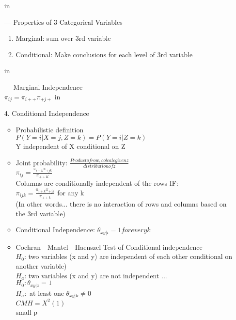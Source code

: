 \documentclass[12 pt]{article}
\begin{document}
\begin{itemize}
\begin{itemize}
    \end{itemize}
     in
    \item [---] Properties of 3 Categorical Variables 
        \begin{enumerate}
                \item Marginal: sum over 3rd variable
                \item Conditional: Make conclusions for each level of 3rd variable 
            \end{enumerate}
     in
    \item [---] Marginal Independence \\
        $ \pi_{ij} = \pi_{i++} \pi_{+j+} $
     in
    \item [4.] Conditional Independence
        \begin{itemize}
        \item Probabilistic definition\\
        $P(Y=i|X=j, Z=k) = P(Y=i|Z=k)$\\
        Y independent of X conditional on Z\\
        \item Joint probability: \( \frac{Product of row, col calc given z}{distribution of z}\)\\
        $ \pi_{ij} = \frac{\pi_{i+k} \pi_{+jk}}{\pi_{++K}}$\\
        Columns are conditionally independent of the rows IF:\\
        $\pi_{ijk} = \frac{\pi_{i+k} \pi_{+jk}}{\pi_{++k}}$ for any k\\
        (In other words... there is no interaction of rows and columns based on the 3rd variable)\\
        \item Conditional Independence: \( \theta_{xy|i} = 1 for every k \)
        \item Cochran - Mantel - Haenszel Test of Conditional independence\\
        \( H_0\): two variables (x and y) are independent of each other conditional on another variable) \\
        \( H_a\): two variables (x and y) are not independent ...\\
        \( H_0: \theta_{xy|z} = 1\)\\
        \( H_a:\) at least one \(\theta_{xy|k} \neq 0\)\\
        \(CMH = X^2(1)\)\\
        small p \\

\end{itemize}
\end{itemize}
\end{document}
